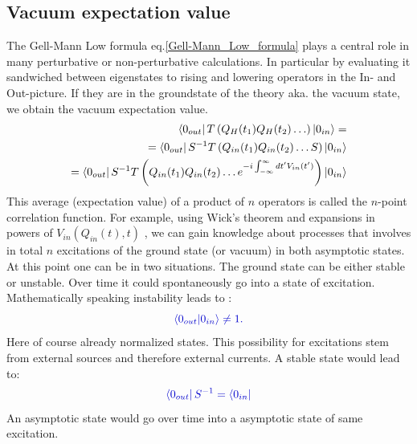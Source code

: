 \documentclass[12pt, titlepage]{article}
\begin{document}
\subsection{Vacuum expectation value} 
The Gell-Mann Low formula eq.\eqref{Gell-Mann_Low_formula} plays a central role in many perturbative or non-perturbative calculations. In particular by evaluating it sandwiched between eigenstates to rising and lowering operators in the In- and Out-picture. If they are in the groundstate of the theory aka. the vacuum state, we obtain the vacuum expectation value.
\begin{subequations}
\begin{align}
\bra{0_{out}}
%
T
\left(
Q_{H}(t_1)
Q_{H}(t_2)
\ldots
\right)
%
\ket{0_{in}}=
\\
=
\bra{0_{out}}
S^{-1}
T\left( 
Q_{in}(t_{1})
Q_{in}(t_{2})
\ldots
S
\right)
\ket{0_{in}}
\\
=
\bra{0_{out}}
S^{-1}
T\left( 
Q_{in}(t_{1})
Q_{in}(t_{2})
\ldots
e^{-i\int^{\infty}_{-\infty}dt'V_{in}(t')}
\right)
\ket{0_{in}}
\end{align}
\end{subequations}%
This average (expectation value) of a product of $ n $ operators is called the $ n $-point correlation function. For example, using Wick's theorem and expansions in powers of $ V_{in}(Q_{in}(t),t) $ , we can gain knowledge about processes that involves in total $ n $ excitations of the ground state (or vacuum) in both asymptotic states.\\
At this point one can be in two situations. The ground state can be either stable or unstable. Over time it could spontaneously go into a state of excitation. Mathematically speaking instability leads to :
\begin{equation}\textcolor[RGB]{0,0,204}{
\braket{0_{out}|0_{in}}
\neq
1.
}
\end{equation}
Here of course already normalized states. This possibility for excitations stem from external sources and therefore external currents. A stable state would lead to:
\begin{equation}\textcolor[RGB]{0,0,204}{
\bra{0_{out}}
S^{-1}
=
\bra{0_{in}}
}
\end{equation}
An asymptotic state would go over time into a asymptotic state of same excitation.
%
%
% 
\newpage
\end{document}
